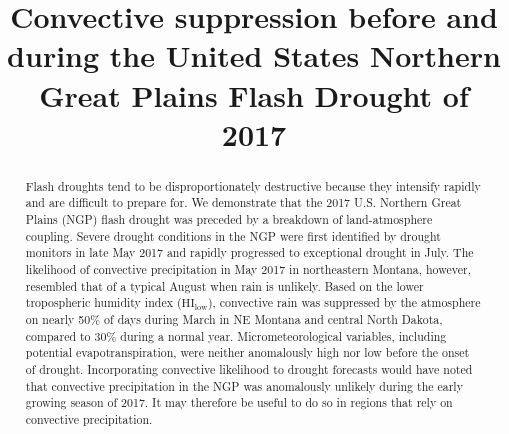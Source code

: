 \documentclass[hess, manuscript]{copernicus}
\begin{document}
\title{Convective suppression before and during the United States Northern Great Plains Flash Drought of 2017}













\received{}
\pubdiscuss{} %
\revised{}
\accepted{}
\published{}




\maketitle



\begin{abstract}
Flash droughts tend to be disproportionately destructive because they intensify rapidly and are difficult to prepare for. We demonstrate that the 2017 U.S. Northern Great Plains (NGP) flash drought was preceded by a breakdown of land-atmosphere coupling. Severe drought conditions in the NGP were first identified by drought monitors in late May 2017 and rapidly progressed to exceptional drought in July. The likelihood of convective precipitation in May 2017 in northeastern Montana, however, resembled that of a typical August when rain is unlikely. Based on the lower tropospheric humidity index ($\mathrm{HI_{low}}$), convective rain was suppressed by the atmosphere on nearly 50\% of days during March in NE Montana and central North Dakota, compared to 30\% during a normal year. Micrometeorological variables, including potential evapotranspiration, were neither anomalously high nor low before the onset of drought. Incorporating convective likelihood to drought forecasts would have noted that convective precipitation in the NGP was anomalously unlikely during the early growing season of 2017. It may therefore be useful to do so in regions that rely on convective precipitation.
\end{abstract}
\end{document}
